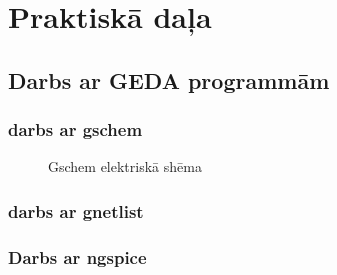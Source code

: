 \documentclass{report}
\begin{document}
\chapter{Praktiskā daļa}
\section{Darbs ar GEDA programmām}
\subsection{darbs ar gschem}

\begin{figure}[h]
  \centering
{}
  \caption{Gschem elektriskā shēma}
  \label{1}
\end{figure}


\subsection{darbs ar gnetlist}



\subsection{Darbs ar ngspice}
\end{document}
